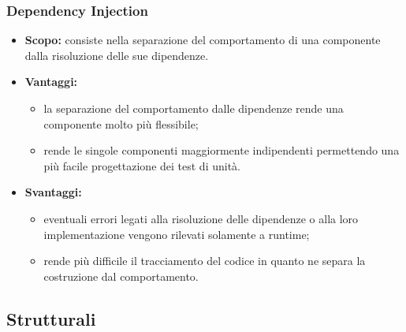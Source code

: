     \subsubsection{Dependency Injection}
     \begin{itemize}
       \item \textbf{Scopo:} consiste nella separazione del comportamento di una componente dalla risoluzione delle sue dipendenze.
	\item \textbf{Vantaggi:}
	  \begin{itemize}
	   \item la separazione del comportamento dalle dipendenze rende una componente molto più flessibile;
	   \item rende le singole componenti maggiormente indipendenti permettendo una più facile progettazione dei test di unità.
	  \end{itemize}
	\item \textbf{Svantaggi:}
	  \begin{itemize}
	   \item eventuali errori legati alla risoluzione delle dipendenze o alla loro implementazione vengono rilevati solamente a runtime;
	   \item rende più difficile il tracciamento del codice in quanto ne separa la costruzione dal comportamento.
	  \end{itemize}
	\end{itemize}

  \subsection{Strutturali}

